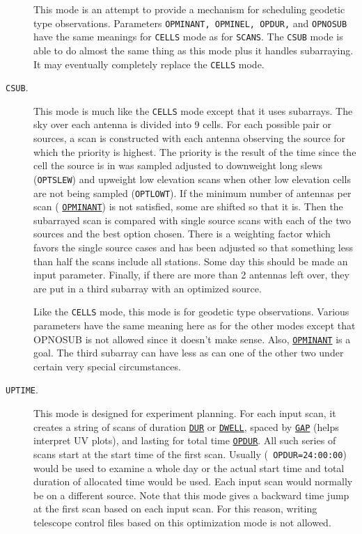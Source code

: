 \documentclass{report}
\begin{document}
\begin{description}
This mode is an attempt to provide a mechanism for scheduling
geodetic type observations.  Parameters {\tt OPMINANT, OPMINEL,
OPDUR,} and {\tt  OPNOSUB} have the same meanings for {\tt CELLS}
mode as for {\tt SCANS}.  The {\tt CSUB} mode is able to do almost
the same thing as this mode plus it handles subarraying.  It may
eventually completely replace the {\tt CELLS} mode.

\item[{\tt CSUB}.]  This mode is much like the {\tt CELLS} mode except
that it uses subarrays.  The sky over each antenna is divided into 9
cells.  For each possible pair or sources, a scan is constructed with
each antenna observing the source for which the priority is highest.
The priority is the result of the time since the cell the source is in
was sampled adjusted to downweight long slews ({\tt OPTSLEW}) and
upweight low elevation scans when other low elevation cells are not
being sampled ({\tt OPTLOWT}).  If the minimum number of antennas per
scan (
{\hyperref[MP:OPMINANT]{{\tt OPMINANT}}}) is not satisfied, some
are shifted so that it is.  Then the subarrayed scan is compared with
single source scans with each of the two sources and the best option
chosen.  There is a weighting factor which favors the single source
cases and has been adjusted so that something less than half the scans
include all stations.  Some day this should be made an input
parameter.  Finally, if there are more than 2 antennas left over, they
are put in a third subarray with an optimized source.

Like the {\tt CELLS} mode, this mode is for geodetic type
observations.  Various parameters have the same meaning here as for
the other modes except that OPNOSUB is not allowed since it doesn't
make sense.  Also, 
{\hyperref[MP:OPMINANT]{{\tt OPMINANT}}} is a goal.
The third subarray can have less as can one of the other two under
certain very special circumstances.

\item[{\tt UPTIME}.] This mode is designed for experiment planning.
For each input scan, it creates a string of scans of duration
{\hyperref[MP:DUR]{{\tt DUR}}} or 
{\hyperref[MP:DWELL]{{\tt DWELL}}}, spaced
by 
{\hyperref[MP:GAP]{{\tt GAP}}} (helps interpret UV plots), and lasting
for total time 
{\hyperref[MP:OPDUR]{{\tt OPDUR}}}.  All such series of
scans start at the start time of the first scan.  Usually ({\tt
OPDUR=24:00:00}) would be used to examine a whole day or the actual
start time and total duration of allocated time would be used.  Each
input scan would normally be on a different source.  Note that this
mode gives a backward time jump at the first scan based on each input
scan.  For this reason, writing telescope control files based on this
optimization mode is not allowed.


\end{description}
\end{document}
